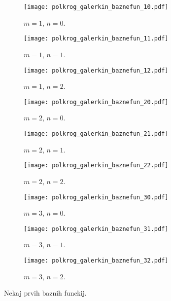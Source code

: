 \documentclass[12pt,a4paper]{article}
\begin{document}
\begin{figure}[H]
    \centering
    \begin{subfigure}[b]{0.3\textwidth}  			
        \texttt{[image: polkrog\_galerkin\_baznefun\_10.pdf]}
        \caption{$m=1$, $n=0$.}
    \end{subfigure}
    \begin{subfigure}[b]{0.3\textwidth}  			
        \texttt{[image: polkrog\_galerkin\_baznefun\_11.pdf]}
        \caption{$m=1$, $n=1$.}
    \end{subfigure}
    \begin{subfigure}[b]{0.3\textwidth}  			
        \texttt{[image: polkrog\_galerkin\_baznefun\_12.pdf]}
        \caption{$m=1$, $n=2$.}
    \end{subfigure}
    
    \begin{subfigure}[b]{0.3\textwidth}  			
        \texttt{[image: polkrog\_galerkin\_baznefun\_20.pdf]}
        \caption{$m=2$, $n=0$.}
    \end{subfigure}
    \begin{subfigure}[b]{0.3\textwidth}  			
        \texttt{[image: polkrog\_galerkin\_baznefun\_21.pdf]}
        \caption{$m=2$, $n=1$.}
    \end{subfigure}
    \begin{subfigure}[b]{0.3\textwidth}  			
        \texttt{[image: polkrog\_galerkin\_baznefun\_22.pdf]}
        \caption{$m=2$, $n=2$.}
    \end{subfigure}
    
    \begin{subfigure}[b]{0.3\textwidth}  			
        \texttt{[image: polkrog\_galerkin\_baznefun\_30.pdf]}
        \caption{$m=3$, $n=0$.}
    \end{subfigure}
    \begin{subfigure}[b]{0.3\textwidth}  			
        \texttt{[image: polkrog\_galerkin\_baznefun\_31.pdf]}
        \caption{$m=3$, $n=1$.}
    \end{subfigure}
    \begin{subfigure}[b]{0.3\textwidth}  			
        \texttt{[image: polkrog\_galerkin\_baznefun\_32.pdf]}
        \caption{$m=3$, $n=2$.}
    \end{subfigure}
    \caption{Nekaj prvih baznih funckij.} \label{fig:slika10}
\end{figure}
\end{document}
